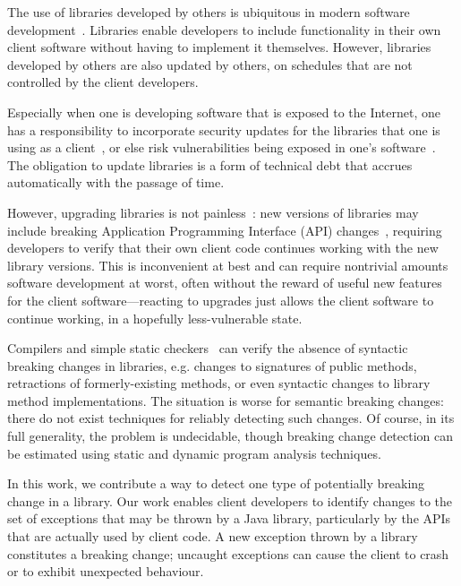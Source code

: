 The use of libraries developed by others is ubiquitous in modern
software development~\cite{huang22:_charac_java,wang20:_java}. Libraries enable developers to include
functionality in their own client software without having to
implement it themselves.  However, libraries developed by others are
also updated by others, on schedules that are not controlled by the client developers.

Especially when one is developing software that is exposed to the Internet, one
has a responsibility to incorporate security updates for the
libraries that one is using as a client~\cite{wu23:_under_threat_upstr_vulner_downs}, or else risk vulnerabilities
being exposed in one's software~\cite{haryono22:_autom_ident_librar_vulner_data,zhan21:_atvhun,alfadel23:_empir_python}. The obligation to update libraries is
a form of technical debt that accrues automatically with the passage
of time.

However, upgrading libraries is not painless~\cite{elizalde18:_towar_smoot_librar_migrat,derr17:_keep,dann23:_upcy}: new
versions of libraries may include breaking Application Programming
Interface (API) changes~\cite{dietrich14:_broken}, requiring developers to verify that their own client
code continues working with the new library versions. This is
inconvenient at best and can require nontrivial amounts software development at worst,
often without the reward of useful new features for the client software---reacting to upgrades
just allows the client software to continue working, in a hopefully less-vulnerable
state.

Compilers and simple static
checkers~\cite{brito18:_apidif,foo18:_effic_static_check_librar_updat}
can verify the absence of syntactic breaking changes in libraries,
e.g. changes to signatures of public methods, retractions of
formerly-existing methods, or even syntactic changes to library method
implementations. The situation is worse for semantic breaking changes:
there do not exist techniques for reliably detecting such changes. Of
course, in its full generality, the problem is undecidable, though
breaking change detection can be estimated using static and dynamic program analysis
techniques.

In this work, we contribute a way to detect one type of potentially breaking
change in a library. Our work enables client developers to identify changes
to the set of exceptions that may be thrown by a Java library, particularly
by the APIs that are actually used by client code. A new exception thrown by a library
constitutes a breaking change; uncaught exceptions can cause the client to crash or
to exhibit unexpected behaviour.

